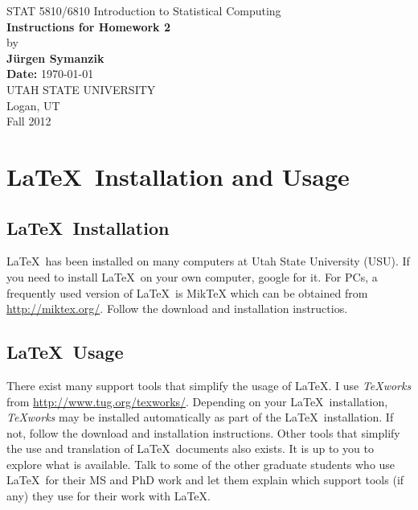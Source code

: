\documentclass[12pt]{article}
\begin{document}
\begin{titlepage}

\begin{center}
{\large STAT 5810/6810 Introduction to Statistical Computing} \\[4cm]

{\LARGE \bf Instructions for Homework  2} \\[1cm]
by \\[0.5cm]
{\bf J\"urgen Symanzik} \\[2.5cm]
{\bf Date:} \today \\[2cm]

UTAH STATE UNIVERSITY \\[0.5cm]
Logan, UT \\[0.5cm]
Fall 2012 \\[0.5cm]
\end{center}

\thispagestyle{empty}
\vfill
\end{titlepage}


\newpage 



\tableofcontents


\newpage


%
%
%




\section{\LaTeX\ Installation and Usage} 

\subsection{\LaTeX\ Installation}

\LaTeX\ has been installed on many computers at Utah State University (USU). If you need to install
\LaTeX\ on your own computer, google for it. For PCs, a frequently used version of \LaTeX\ is
MikTeX which can be obtained from \url{http://miktex.org/}.
Follow the download and installation instructios.


\subsection{\LaTeX\ Usage}

There exist many support tools that simplify the usage of \LaTeX. 
I use {\it TeXworks} from \url{http://www.tug.org/texworks/}.
Depending on your \LaTeX\ installation, {\it TeXworks} may be installed
automatically as part of the  \LaTeX\ installation.
If not, follow the download and installation instructions.
Other tools that simplify the use and translation of \LaTeX\ documents
also exists. It is up to you to explore what is available. Talk to some
of the other graduate students who use \LaTeX\ for their MS and PhD work
and let them explain which support tools (if any) they use for their work with \LaTeX.
\end{document}
